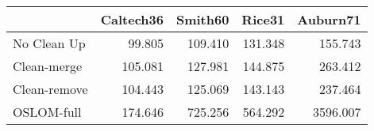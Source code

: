 \begin{tabular}{lrrrr}
\toprule
{} & Caltech36 & Smith60 &  Rice31 & Auburn71 \\
\midrule
No Clean Up  &    99.805 & 109.410 & 131.348 &  155.743 \\
Clean-merge  &   105.081 & 127.981 & 144.875 &  263.412 \\
Clean-remove &   104.443 & 125.069 & 143.143 &  237.464 \\
OSLOM-full   &   174.646 & 725.256 & 564.292 & 3596.007 \\
\bottomrule
\end{tabular}
